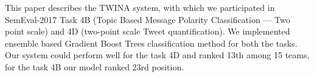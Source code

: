 This paper describes the TWINA system, with which we participated in SemEval-2017 Task 4B (Topic Based Message Polarity Classification --- Two point scale) and 4D (two-point scale Tweet quantification). We implemented ensemble based Gradient Boost Trees classification method for both the tasks. Our system could perform well for the task 4D and ranked 13th among 15 teams, for the task 4B our model ranked 23rd position.
